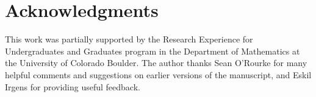 \documentclass[10pt,reqno]{amsart}
\newtheorem{corollary}[theorem]{Corollary}
\theoremstyle{remark}
\newcommand{\C}{\mathbb C}
\newcommand{\weak}{\Rightarrow}
\begin{document}
\section*{Acknowledgments}

This work was partially supported by the Research Experience for Undergraduates and Graduates program in the Department of Mathematics at the University of Colorado Boulder. The author thanks Sean O'Rourke for many helpful comments and suggestions on earlier versions of the manuscript, and Eskil Irgens for providing useful feedback.




\end{document}
